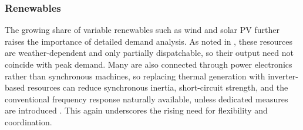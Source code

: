 \subsubsection*{Renewables}
The growing share of variable renewables such as wind and solar PV further raises the importance of detailed demand analysis. As noted in , these resources are weather-dependent and only partially dispatchable, so their output need not coincide with peak demand. Many are also connected through power electronics rather than synchronous machines, so replacing thermal generation with inverter-based resources can reduce synchronous inertia, short-circuit strength, and the conventional frequency response naturally available, unless dedicated measures are introduced \cite{ElectricitySecurityMatters}. This again underscores the rising need for flexibility and coordination.

